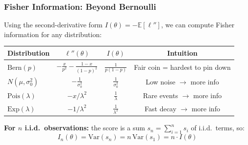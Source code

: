 \documentclass[aspectratio=169]{beamer}
\begin{document}
\begin{frame}
\frametitle{Fisher Information: Beyond Bernoulli}

\small
Using the second-derivative form $I(\theta) = -\mathbb{E}[\ell'']$, we can compute Fisher information for any distribution:

\vspace{0.15cm}
\begin{center}
\renewcommand{\arraystretch}{1.5}
\begin{tabular}{@{}lccc@{}}
  \textbf{Distribution} & $\ell''(\theta)$ & $I(\theta)$ & \textbf{Intuition} \\
  \hline
  $\text{Bern}(p)$ & $-\frac{x}{p^2} - \frac{1{-}x}{(1{-}p)^2}$ & $\frac{1}{p(1{-}p)}$ & Fair coin = hardest to pin down \\[4pt]
  $N(\mu, \sigma_0^2)$ & $-\frac{1}{\sigma_0^2}$ & $\frac{1}{\sigma_0^2}$ & Low noise $\to$ more info \\[4pt]
  $\text{Pois}(\lambda)$ & $-x/\lambda^2$ & $\frac{1}{\lambda}$ & Rare events $\to$ more info \\[4pt]
  $\text{Exp}(\lambda)$ & $-1/\lambda^2$ & $\frac{1}{\lambda^2}$ & Fast decay $\to$ more info \\
  \hline
\end{tabular}
\end{center}

\pause
\vspace{0.05cm}
\textbf{For $n$ i.i.d.\ observations:}\; the score is a sum $s_n = \sum_{i=1}^n s_i$ of i.i.d.\ terms, so:
$$I_n(\theta) = \text{Var}(s_n) = n\,\text{Var}(s_1) = n \cdot I(\theta)$$

\vspace{-0.15cm}
\begin{center}
\end{center}
\end{frame}
\end{document}
